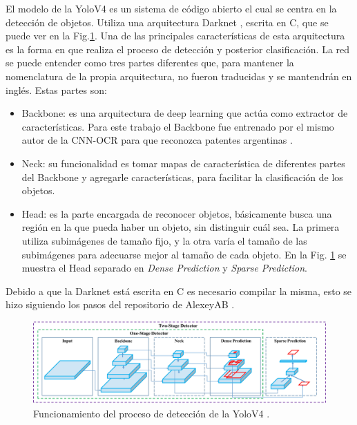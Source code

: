 El modelo de la YoloV4 es un sistema de código abierto el cual se centra en la detección de objetos. Utiliza una arquitectura Darknet \cite{noauthor_darknet_nodate}, escrita en C, que se puede ver en la Fig.\ref{fig:funcionamiento-yolo}.
Una de las principales características de esta arquitectura es la forma en que realiza el proceso de detección y posterior clasificación. La red se puede entender como tres partes diferentes que, para mantener la nomenclatura de la propia arquitectura, no fueron traducidas y se mantendrán en inglés. Estas partes son:

\begin{itemize}
    \item Backbone: es una arquitectura de deep learning que actúa como extractor de características.
          Para este trabajo el Backbone fue entrenado por el mismo autor de la CNN-OCR para que reconozca patentes argentinas \cite{ankandrew_localizador_2021}.
    \item Neck: su funcionalidad es tomar mapas de característica de diferentes partes del Backbone y agregarle características, para facilitar la clasificación de los objetos.

    \item Head: es la parte encargada de reconocer objetos, básicamente busca una región en la que pueda haber un objeto, sin distinguir cuál sea. La primera utiliza subimágenes de tamaño fijo, y la otra varía el tamaño de las subimágenes para adecuarse mejor al tamaño de cada objeto.
          En la Fig. \ref{fig:funcionamiento-yolo} se muestra el Head separado en \textit{Dense Prediction} y \textit{Sparse Prediction}.
\end{itemize}

Debido a que la Darknet está escrita en C es necesario compilar la misma, esto se hizo siguiendo los pasos del repositorio de AlexeyAB \cite{alexey_yolo_2023}.


\begin{figure}[bth]
    \centering
    \includegraphics[width=\textwidth]{imgs/funcionamiento-yolo.png}
    \caption{Funcionamiento del proceso de detección de la YoloV4 \cite{bochkovskiy_yolov4_2020}.}
    \label{fig:funcionamiento-yolo}
\end{figure}

